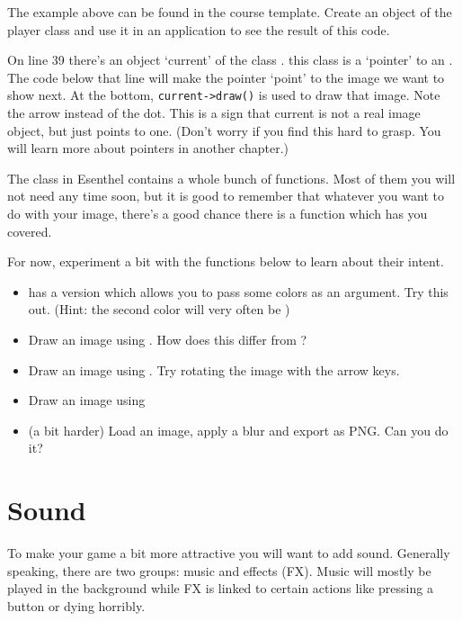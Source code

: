 \begin{exercise}
The example above can be found in the course template. Create an object of the player class and use it in an application to see the result of this code.
\end{exercise}

\begin{note}
On line 39 there's an object `current' of the class . this class is a `pointer' to an . The code below that line will make the pointer `point' to the image we want to show next. At the bottom, \verb|current->draw()| is used to draw that image. Note the arrow instead of the dot. This is a sign that current is not a real image object, but just points to one. (Don't worry if you find this hard to grasp. You will learn more about pointers in another chapter.)
\end{note}

\begin{exercise}
The  class in Esenthel contains a whole bunch of functions. Most of them you will not need any time soon, but it is good to remember that whatever you want to do with your image, there's a good chance there is a function which has you covered.

For now, experiment a bit with the functions below to learn about their intent.

\begin{itemize}
\item {} has a version which allows you to pass some colors as an argument. Try this out. (Hint: the second color will very often be )
\item Draw an image using . How does this differ from ?
\item Draw an image using . Try rotating the image with the arrow keys.
\item Draw an image using 
\item (a bit harder) Load an image, apply a blur and export as PNG. Can you do it?
\end{itemize}
\end{exercise}

\section{Sound}
To make your game a bit more attractive you will want to add sound. Generally speaking, there are two groups: music and effects (FX). Music will mostly be played in the background while FX is linked to certain actions like pressing a button or dying horribly.

